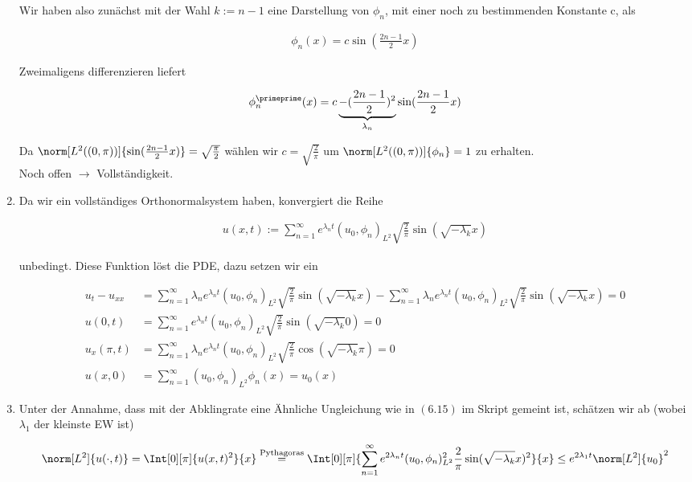\begin{solution}
\begin{enumerate}[label = (\roman*)]
  Wir haben also zunächst mit der Wahl $k := n-1$ eine Darstellung von $\phi_n$, mit einer noch zu bestimmenden Konstante c, als

  \begin{align*}
    \phi_n(x) = c \sin(\frac{2n-1}{2}x)
  \end{align*}

  Zweimaligens differenzieren liefert

  \begin{align*}
    \phi_n^\primeprime(x) = c \underbrace{-(\frac{2n-1}{2})^2}_{\lambda_n} \sin(\frac{2n-1}{2}x)
  \end{align*}

  Da $\norm[L^2((0,\pi))]{\sin(\frac{2n-1}{2}x)} = \sqrt{\frac{\pi}{2}}$ wählen wir $c = \sqrt{\frac{2}{\pi}}$ um $\norm[L^2((0,\pi))]{\phi_n} = 1$ zu erhalten. \\
  Noch offen $\rightarrow$ Vollständigkeit.
  \item Da wir ein vollständiges Orthonormalsystem haben, konvergiert die Reihe

  \begin{align*}
    u(x,t)
    :=
    \sum_{n=1}^\infty e^{\lambda_n t} (u_0, \phi_n)_{L^2} \sqrt{\frac{2}{\pi}} \sin(\sqrt{-\lambda_k} x)
  \end{align*}

  unbedingt. Diese Funktion löst die PDE, dazu setzen wir ein

  \begin{align*}
    u_t - u_{xx} &=\sum_{n=1}^\infty \lambda_n e^{\lambda_n t} (u_0, \phi_n)_{L^2} \sqrt{\frac{2}{\pi}} \sin(\sqrt{-\lambda_k} x) - \sum_{n=1}^\infty \lambda_n e^{\lambda_n t} (u_0, \phi_n)_{L^2} \sqrt{\frac{2}{\pi}} \sin(\sqrt{-\lambda_k} x)= 0 \\
    u(0,t) &= \sum_{n=1}^\infty e^{\lambda_n t} (u_0, \phi_n)_{L^2} \sqrt{\frac{2}{\pi}} \sin(\sqrt{-\lambda_k} 0) = 0 \\
    u_x(\pi, t) &= \sum_{n=1}^\infty \lambda_n e^{\lambda_n t} (u_0, \phi_n)_{L^2} \sqrt{\frac{2}{\pi}} \cos(\sqrt{-\lambda_k} \pi)= 0 \\
    u(x, 0) &= \sum_{n=1}^\infty (u_0, \phi_n)_{L^2} \phi_n(x) = u_0(x)
  \end{align*}

  \item Unter der Annahme, dass mit der Abklingrate eine Ähnliche Ungleichung wie in $(6.15)$ im Skript gemeint ist, schätzen wir ab (wobei $\lambda_1$ der kleinste EW ist)

  \begin{align*}
    \norm[L^2]{u(\cdot,t)}
    =
    \Int[0][\pi]{u(x,t)^2}{x}
    \stackrel{\text{Pythagoras}}{=}
    \Int[0][\pi]{\sum_{n=1}^\infty e^{2\lambda_n t} (u_0, \phi_n)_{L^2}^2 \frac{2}{\pi} \sin(\sqrt{-\lambda_k} x)^2}{x}
    \leq
    e^{2\lambda_1 t} \norm[L^2]{u_0}^2
  \end{align*}


\end{enumerate}
\end{solution}
